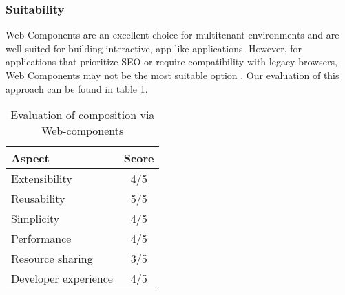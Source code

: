 \subsubsection{Suitability}
Web Components are an excellent choice for multitenant environments and are well-suited for building interactive, app-like applications. However, for applications that prioritize SEO or require compatibility with legacy browsers, Web Components may not be the most suitable option \cite{Geers}\cite{MezzaliraBuildingMf}. Our evaluation of this approach can be found in table \ref{table:web-compoents-evaluation}.

\begin{table}[h]
  \centering
  \begin{tabular}{|p{4cm}|c|}
    \hline
      \textbf{Aspect} & \textbf{Score} \\
    \hline
      Extensibility & 4/5 \\
    \hline
      Reusability & 5/5 \\
    \hline
      Simplicity & 4/5 \\
    \hline
      Performance & 4/5 \\
    \hline
      Resource sharing & 3/5 \\
    \hline
      Developer experience & 4/5 \\
    \hline
  \end{tabular}
  \caption{Evaluation of composition via Web-components}
  \label{table:web-compoents-evaluation}
\end{table}

